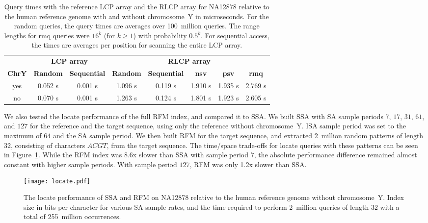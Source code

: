 \documentclass[a4paper,11pt]{llncs}
\newcommand{\SA}{\textsf{SA}}
\newcommand{\ISA}{\textsf{ISA}}
\newcommand{\SSA}{\textsf{SSA}}
\newcommand{\RFM}{\textsf{RFM}}
\newcommand{\LCP}{\textsf{LCP}}
\newcommand{\RLCP}{\textsf{RLCP}}
\newcommand{\locate}{\textsf{locate}}
\newcommand{\nsv}{\textsf{nsv}}
\newcommand{\psv}{\textsf{psv}}
\newcommand{\rmq}{\textsf{rmq}}
\newcommand{\mus}{\textmu{}s}
\begin{document}
\begin{table}
\caption{Query times with the reference \LCP{} array and the \RLCP{} array for NA12878 relative to the human reference genome with and without chromosome~Y in microseconds. For the random queries, the query times are averages over 100~million queries. The range lengths for \rmq{} queries were $16^{k}$ (for $k \ge 1$) with probability $0.5^{k}$. For sequential access, the times are averages per position for scanning the entire \LCP{} array.}\label{table:rlcp queries}
\setlength{\extrarowheight}{2pt}
\setlength{\tabcolsep}{3pt}
\begin{center}
\begin{tabular}{c|cc|ccccc}
\hline
 & \multicolumn{2}{c|}{\textbf{\LCP{} array}} & \multicolumn{5}{c}{\textbf{\RLCP{} array}} \\
\textbf{ChrY} & \textbf{Random} & \textbf{Sequential} & \textbf{Random} & \textbf{Sequential} & \textbf{\nsv} & \textbf{\psv} & \textbf{\rmq} \\
\hline
yes & 0.052 \mus & 0.001 \mus & 1.096 \mus & 0.119 \mus & 1.910 \mus & 1.935 \mus & 2.769 \mus \\
no  & 0.070 \mus & 0.001 \mus & 1.263 \mus & 0.124 \mus & 1.801 \mus & 1.923 \mus & 2.605 \mus \\
\hline
\end{tabular}
\end{center}
\end{table}

We also tested the \locate{} performance of the full \RFM{} index, and compared it to \SSA. We built \SSA{} with \SA{} sample periods $7$, $17$, $31$, $61$, and $127$ for the reference and the target sequence, using only the reference without chromosome~Y. \ISA{} sample period was set to the maximum of $64$ and the \SA{} sample period. We then built \RFM{} for the target sequence, and extracted 2~million random patterns of length $32$, consisting of characters $ACGT$, from the target sequence. The time/space trade-offs for \locate{} queries with these patterns can be seen in Figure~\ref{fig:locate}. While the \RFM{} index was 8.6x slower than \SSA{} with sample period $7$, the absolute performance difference remained almost constant with higher sample periods. With sample period $127$, \RFM{} was only 1.2x slower than \SSA.

\begin{figure}
\begin{center}
\texttt{[image: locate.pdf]}
\end{center}
\caption{The \locate{} performance of \SSA{} and \RFM{} on NA12878 relative to the human reference genome without chromosome~Y. Index size in bits per character for various \SA{} sample rates, and the time required to perform 2~million queries of length $32$ with a total of 255~million occurrences.}\label{fig:locate}
\end{figure}
\end{document}
